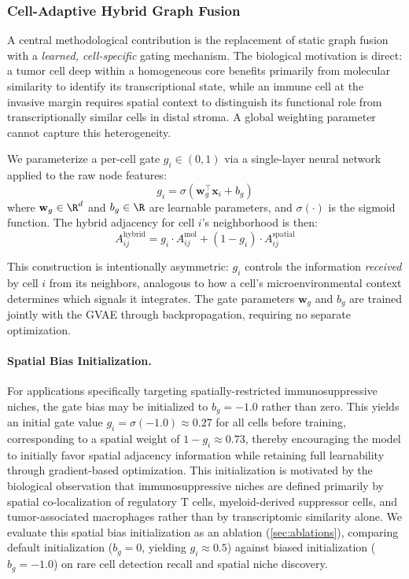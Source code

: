\documentclass{article}
\newcommand{\sigmoid}{\sigma}
\begin{document}
\subsubsection{Cell-Adaptive Hybrid Graph Fusion}
\label{sec:adaptive_fusion}

A central methodological contribution is the replacement of static graph fusion with a \textit{learned, cell-specific} gating mechanism. The biological motivation is direct: a tumor cell deep within a homogeneous core benefits primarily from molecular similarity to identify its transcriptional state, while an immune cell at the invasive margin requires spatial context to distinguish its functional role from transcriptionally similar cells in distal stroma. A global weighting parameter cannot capture this heterogeneity.

We parameterize a per-cell gate $g_i \in (0, 1)$ via a single-layer neural network applied to the raw node features:
\begin{equation}
    g_i = \sigmoid(\mathbf{w}_g^\top \mathbf{x}_i + b_g)
    \label{eq:gate}
\end{equation}
where $\mathbf{w}_g \in \R^d$ and $b_g \in \R$ are learnable parameters, and $\sigmoid(\cdot)$ is the sigmoid function. The hybrid adjacency for cell $i$'s neighborhood is then:
\begin{equation}
    A^{\text{hybrid}}_{ij} = g_i \cdot A^{\text{mol}}_{ij} + (1 - g_i) \cdot A^{\text{spatial}}_{ij}
    \label{eq:hybrid}
\end{equation}

This construction is intentionally asymmetric: $g_i$ controls the information \textit{received} by cell $i$ from its neighbors, analogous to how a cell's microenvironmental context determines which signals it integrates. The gate parameters $\mathbf{w}_g$ and $b_g$ are trained jointly with the GVAE through backpropagation, requiring no separate optimization.

\paragraph{Spatial Bias Initialization.} For applications specifically targeting spatially-restricted immunosuppressive niches, the gate bias may be initialized to $b_g = -1.0$ rather than zero. This yields an initial gate value $g_i = \sigmoid(-1.0) \approx 0.27$ for all cells before training, corresponding to a spatial weight of $1 - g_i \approx 0.73$, thereby encouraging the model to initially favor spatial adjacency information while retaining full learnability through gradient-based optimization. This initialization is motivated by the biological observation that immunosuppressive niches are defined primarily by spatial co-localization of regulatory T cells, myeloid-derived suppressor cells, and tumor-associated macrophages rather than by transcriptomic similarity alone. We evaluate this spatial bias initialization as an ablation (\cref{sec:ablations}), comparing default initialization ($b_g = 0$, yielding $g_i \approx 0.5$) against biased initialization ($b_g = -1.0$) on rare cell detection recall and spatial niche discovery.
\end{document}

